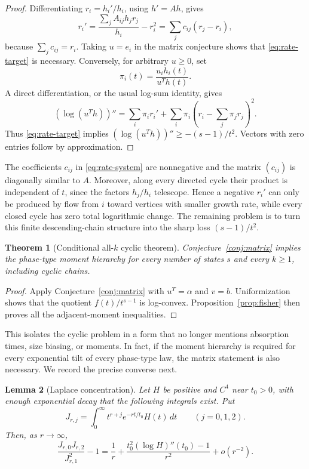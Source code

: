 \documentclass[11pt]{article}
\newtheorem{theorem}{Theorem}
\newtheorem{lemma}[theorem]{Lemma}
\theoremstyle{remark}
\begin{document}
\begin{proof}
Differentiating $r_i=h_i'/h_i$, using $h'=Ah$, gives
\[
 r_i'
 =\frac{\sum_jA_{ij}h_jr_j}{h_i}-r_i^2
 =\sum_jc_{ij}(r_j-r_i),
\]
because $\sum_jc_{ij}=r_i$.  Taking $u=e_i$ in the matrix conjecture
shows that \eqref{eq:rate-target} is necessary.  Conversely, for arbitrary
$u\geq0$, set
\[
 \pi_i(t)=\frac{u_i h_i(t)}{u^Th(t)}.
\]
A direct differentiation, or the usual log-sum identity, gives
\[
 (\log(u^Th))''
 =\sum_i\pi_i r_i'
   +\sum_i\pi_i\left(r_i-\sum_j\pi_jr_j\right)^2.
\]
Thus \eqref{eq:rate-target} implies
$(\log(u^Th))''\geq-(s-1)/t^2$.  Vectors with zero entries follow by
approximation.
\end{proof}

The coefficients $c_{ij}$ in \eqref{eq:rate-system} are nonnegative and the
matrix $(c_{ij})$ is diagonally similar to $A$.  Moreover, along every
directed cycle their product is independent of $t$, since the factors
$h_j/h_i$ telescope.  Hence a negative $r_i'$ can only be produced by flow
from $i$ toward vertices with smaller growth rate, while every closed cycle
has zero total logarithmic change.  The remaining problem is to turn this
finite descending-chain structure into the sharp loss $(s-1)/t^2$.

\begin{theorem}[Conditional all-\(k\) cyclic theorem]
Conjecture~\ref{conj:matrix} implies the phase-type moment hierarchy for every
number of states \(s\) and every \(k\geq1\), including cyclic chains.
\end{theorem}

\begin{proof}
Apply Conjecture~\ref{conj:matrix} with
\(u^T=\alpha\) and \(v=b\).  Uniformization shows that the quotient
\(f(t)/t^{s-1}\) is log-convex.  Proposition~\ref{prop:fisher} then proves all
the adjacent-moment inequalities.
\end{proof}

This isolates the cyclic problem in a form that no longer mentions absorption
times, size biasing, or moments.  In fact, if the moment hierarchy is required
for every exponential tilt of every phase-type law, the matrix statement is
also necessary.  We record the precise converse next.

\begin{lemma}[Laplace concentration]\label{lem:laplace-concentration}
Let $H$ be positive and $C^4$ near $t_0>0$, with enough exponential
decay that the following integrals exist.  Put
\[
 J_{r,j}=\int_0^\infty
          t^{r+j}e^{-rt/t_0}H(t)\,dt
 \qquad(j=0,1,2).
\]
Then, as $r\to\infty$,
\begin{equation}\label{eq:laplace-expansion}
 \frac{J_{r,0}J_{r,2}}{J_{r,1}^2}-1
 =\frac1r+
   \frac{t_0^2(\log H)''(t_0)-1}{r^2}
   +o(r^{-2}).
\end{equation}
\end{lemma}
\end{document}
